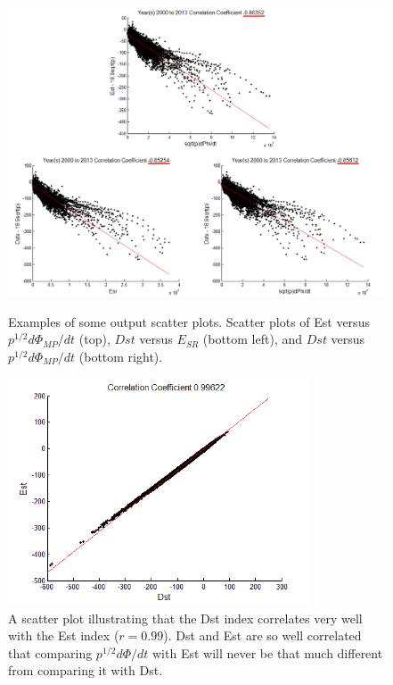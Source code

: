 \documentclass[12pt]{report} %
\begin{document}
\begin{figure}
\centering
    \vspace{-5pt}
    \includegraphics[width=\textwidth]{./dstestscatter}
 \vspace{-15pt}
  \caption{Examples of some output scatter plots. Scatter plots of Est versus $p^{1/2}d\Phi_{MP}/dt$ (top), $Dst$ versus $E_{SR}$ (bottom left), and $Dst$ versus $p^{1/2}d\Phi_{MP}/dt$ (bottom right).} \label{fig:dstestscatter}
  
	\vspace{15pt}
    \includegraphics[width=0.8\textwidth]{./estscatter}
 \vspace{-5pt}
  \caption{A scatter plot illustrating that the Dst index correlates very well with the Est index ($r=0.99$). Dst and Est are so well correlated that comparing $p^{1/2}d\Phi/dt$ with Est will never be that much different from comparing it with Dst.} \label{fig:estdst}
 \end{figure} 
 
\end{document}

